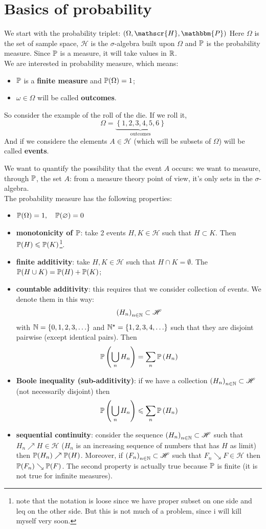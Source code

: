 \documentclass{report}
\begin{document}
\section{Basics of probability}
We start with the probability triplet: $(\Omega,\mathscr{H},\mathbbm{P})$ 
Here $\Omega$ is the set of sample space, $\mathscr{H}$ is the $\sigma$-algebra built upon $\Omega$ and $\mathbb{P}$ is the probability measure. Since $\mathbb{P}$ is a measure, it will take values in $\mathbb{R}$. \\
We are interested in probability measure, which means:
\begin{itemize}
	\item $\mathbb{P}$ is a \textbf{finite measure} and $\mathbb{P}(\Omega)=1$;
	\item $\omega \in\Omega$ will be called \textbf{outcomes}.
\end{itemize}
So consider the example of the roll of the die. If we roll it, 
\[\Omega=\underbrace{\left\{1,2,3,4,5,6\right\}}_{\text{outcomes}}\]
And if we considere the elements $A\in\mathscr{H}$ (which will be subsets of $\Omega$) will be called \textbf{events}.\par We want to quantify the possibility that the event $A$ occurs: we want to measure, through $\mathbb{P}$, the set $A$: from a measure theory point of view, it's only sets in the $\sigma$-algebra. \\The probability measure has the following properties:
\begin{itemize}
	\item $\mathbb{P}(\Omega)=1,\quad\mathbb{P}(\varnothing)=0$
	\item \textbf{monotonicity of $\mathbb{P}$}: take 2 events $H,K\in\mathscr{H}$ such that $H\subset K$. Then $\mathbb{P}(H)\leqslant\mathbb{P}(K)$\footnote{note that the notation is loose since we have proper subset on one side and leq on the other side. But this is not much of a problem, since i will kill myself very soon.}.
	\item \textbf{finite additivity}: take $H,K\in\mathscr{H}$ such that $H\cap K=\emptyset$. The $\mathbb{P}(H\cup K)=\mathbb{P}(H)+\mathbb{P}(K)$;
	\item \textbf{countable additivity}: this requires that we consider collection of events. We denote them in this way:
	\[\left(H_n\right)_{n\in\mathbb{N}}\subset\mathscr{H}\] with $\mathbb{N}=\{0,1,2,3,\ldots\}$ and $\mathbb{N}^\star=\{1,2,3,4,\ldots\}$ such that they are disjoint pairwise (except identical pairs). Then
	\[\mathbb{P}\left(\bigcup_nH_n\right)=\sum_n\mathbb{P}\left(H_n\right)\]
	\item \textbf{Boole inequality (sub-additivity)}: if we have a collection $\left(H_n\right)_{n\in\mathbb{N}}\subset\mathscr{H}$ (not necessarily disjoint) then $$\mathbb{P}\left(\bigcup_nH_n\right)\leqslant\sum_n\mathbb{P}\left(H_n\right)$$ 
	\item \textbf{sequential continuity}: consider the sequence $\left(H_n\right)_{n\in\mathbb{N}}\subset\mathscr{H}$ such that $H_n\nearrow H\in\mathscr{H}$ ($H_n$ is an increasing sequence of numbers that has $H$ as limit) then $\mathbb{P}(H_n)\nearrow\mathbb{P}(H)$. Moreover, if $\left(F_n\right)_{n\in\mathbb{N}}\subset\mathscr{H}$ such that $F_n\searrow F\in\mathscr{H}$ then $\mathbb{P}(F_n)\searrow\mathbb{P}(F)$. The second property is actually true because $\mathbb{P}$ is finite (it is not true for infinite measures). 
\end{itemize}
\end{document}
